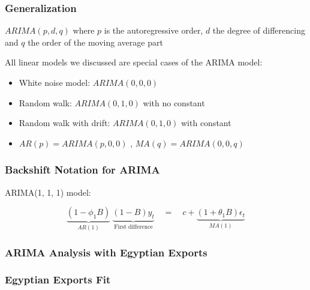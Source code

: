 \documentclass{beamer}
\newenvironment{wideitemize}{\itemize\addtolength{\itemsep}{10pt}}{\enditemize}
\begin{document}
\begin{frame}
  \frametitle{Generalization}

  \begin{wideitemize}
  \item $ARIMA(p, d, q)$ where $p$ is the autoregressive order, $d$ the degree of differencing and $q$ the order of the moving average part
  \item All linear models we discussed are special cases of the ARIMA model:
    \begin{itemize}
    \item White noise model: $ARIMA(0, 0, 0)$
    \item Random walk: $ARIMA(0, 1, 0)$ with no constant
    \item Random walk with drift: $ARIMA(0, 1, 0)$ with constant  
    \item $AR(p) = ARIMA(p, 0, 0)$ , $MA(q) = ARIMA(0, 0, q)$
    \end{itemize}
  \end{wideitemize}
    
\end{frame}



\begin{frame}
  \frametitle{Backshift Notation for ARIMA}
  ARIMA(1, 1, 1) model:

  \begin{equation*}
    \underbrace{(1-\phi_1B)}_{AR(1)} \ \underbrace{(1-B)y_t}_{\text{First difference}} \quad = \quad c + \underbrace{(1+\theta_1B)\epsilon_t}_{MA(1)}
  \end{equation*}  
\end{frame}



\begin{frame}
  \frametitle{ARIMA Analysis with Egyptian Exports}
\end{frame}


\begin{frame}
  \frametitle{Egyptian Exports Fit}
\end{frame}
\end{document}
